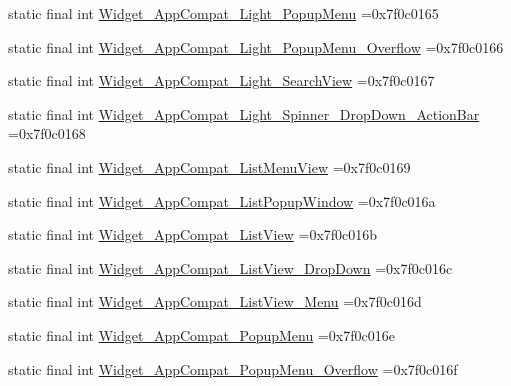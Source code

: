 \begin{DoxyCompactItemize}
\item 
static final int \mbox{\hyperlink{classbr_1_1unb_1_1cic_1_1mp_1_1marketmaster_1_1test_1_1R_1_1style_a28c75ba9c4847032e5f524542a235958}{Widget\+\_\+\+App\+Compat\+\_\+\+Light\+\_\+\+Popup\+Menu}} =0x7f0c0165
\item 
static final int \mbox{\hyperlink{classbr_1_1unb_1_1cic_1_1mp_1_1marketmaster_1_1test_1_1R_1_1style_aa0d25578fc32d9f6aa81207a195e6dad}{Widget\+\_\+\+App\+Compat\+\_\+\+Light\+\_\+\+Popup\+Menu\+\_\+\+Overflow}} =0x7f0c0166
\item 
static final int \mbox{\hyperlink{classbr_1_1unb_1_1cic_1_1mp_1_1marketmaster_1_1test_1_1R_1_1style_a1cea8c75d8be619f69ed144243695802}{Widget\+\_\+\+App\+Compat\+\_\+\+Light\+\_\+\+Search\+View}} =0x7f0c0167
\item 
static final int \mbox{\hyperlink{classbr_1_1unb_1_1cic_1_1mp_1_1marketmaster_1_1test_1_1R_1_1style_a760d677c8e4f57f2536629378bbdb6dc}{Widget\+\_\+\+App\+Compat\+\_\+\+Light\+\_\+\+Spinner\+\_\+\+Drop\+Down\+\_\+\+Action\+Bar}} =0x7f0c0168
\item 
static final int \mbox{\hyperlink{classbr_1_1unb_1_1cic_1_1mp_1_1marketmaster_1_1test_1_1R_1_1style_a861d9072153e5d01535cc5a55b92bbd7}{Widget\+\_\+\+App\+Compat\+\_\+\+List\+Menu\+View}} =0x7f0c0169
\item 
static final int \mbox{\hyperlink{classbr_1_1unb_1_1cic_1_1mp_1_1marketmaster_1_1test_1_1R_1_1style_a9c175cad600f91c3390c6e5ec909a3a5}{Widget\+\_\+\+App\+Compat\+\_\+\+List\+Popup\+Window}} =0x7f0c016a
\item 
static final int \mbox{\hyperlink{classbr_1_1unb_1_1cic_1_1mp_1_1marketmaster_1_1test_1_1R_1_1style_ad0698415f3e1f9b9bbfc213455622ccd}{Widget\+\_\+\+App\+Compat\+\_\+\+List\+View}} =0x7f0c016b
\item 
static final int \mbox{\hyperlink{classbr_1_1unb_1_1cic_1_1mp_1_1marketmaster_1_1test_1_1R_1_1style_a0d9fd41760a5f898ff5f74cfcbddb8ba}{Widget\+\_\+\+App\+Compat\+\_\+\+List\+View\+\_\+\+Drop\+Down}} =0x7f0c016c
\item 
static final int \mbox{\hyperlink{classbr_1_1unb_1_1cic_1_1mp_1_1marketmaster_1_1test_1_1R_1_1style_ae6c58fa0256178b50947ef19b2910f86}{Widget\+\_\+\+App\+Compat\+\_\+\+List\+View\+\_\+\+Menu}} =0x7f0c016d
\item 
static final int \mbox{\hyperlink{classbr_1_1unb_1_1cic_1_1mp_1_1marketmaster_1_1test_1_1R_1_1style_a4842075adab597f16a59c8d0dd768e76}{Widget\+\_\+\+App\+Compat\+\_\+\+Popup\+Menu}} =0x7f0c016e
\item 
static final int \mbox{\hyperlink{classbr_1_1unb_1_1cic_1_1mp_1_1marketmaster_1_1test_1_1R_1_1style_afb56c2425b2a7a11dc66791894d20f49}{Widget\+\_\+\+App\+Compat\+\_\+\+Popup\+Menu\+\_\+\+Overflow}} =0x7f0c016f

\end{DoxyCompactItemize}
